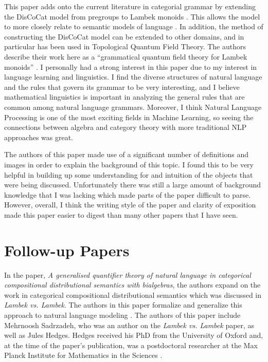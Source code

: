 \documentclass[11pt, reqno]{amsart}
\theoremstyle{plain}
\theoremstyle{definition}
\theoremstyle{example}
\begin{document}
\par
This paper adds onto the current literature in categorial grammar by extending the DisCoCat model from pregroups to Lambek monoids \cite{lambekvlambek}. This allows the model to more closely relate to semantic models of language \cite{lambekvlambek}. In addition, the method of constructing the DisCoCat model can be extended to other domains, and in particular has been used in Topological Quantum Field Theory. The authors describe their work here as a ``grammatical quantum field theory for Lambek monoids'' \cite{lambekvlambek}. I personally had a strong interest in this paper due to my interest in language learning and linguistics. I find the diverse structures of natural language and the rules that govern its grammar to be very interesting, and I believe mathematical linguistics is important in analyzing the general rules that are common among natural language grammars. Moreover, I think Natural Language Processing is one of the most exciting fields in Machine Learning, so seeing the connections between algebra and category theory with more traditional NLP approaches was great.

\par
The authors of this paper made use of a significant number of definitions and images in order to explain the background of this topic. I found this to be very helpful in building up some understanding for and intuition of the objects that were being discussed. Unfortunately there was still a large amount of background knowledge that I was lacking which made parts of the paper difficult to parse. However, overall, I think the writing style of the paper and clarity of exposition made this paper easier to digest than many other papers that I have seen.

\appendix
\section{Follow-up Papers}

\par
In the paper, \textit{A generalised quantifier theory of natural language in categorical compositional distributional semantics with bialgebras}, the authors expand on the work in categorical compositional distributional semantics which was discussed in \textit{Lambek vs. Lambek}. The authors in this paper formalize and generalize this approach to natural language modeling \cite{quantifier}. The authors of this paper include Mehrnoosh Sadrzadeh, who was an author on the \textit{Lambek vs. Lambek} paper, as well as Jules Hedges. Hedges received his PhD from the University of Oxford and, at the time of the paper's publication, was a postdoctoral researcher at the Max Planck Institute for Mathematics in the Sciences \cite{hedges}.
\end{document}

